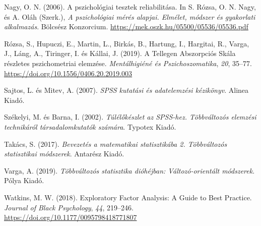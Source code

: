 \documentclass[
  letterpaper,
]{krantz}
\newlength{\cslhangindent}
\newlength{\cslentryspacingunit} %
\newenvironment{CSLReferences}[2] %
 {%
  \setlength{\parindent}{0pt}
  \ifodd #1
  \let\oldpar\par
  \def\par{\hangindent=\cslhangindent\oldpar}
  \fi
  \setlength{\parskip}{#2\cslentryspacingunit}
 }%
 {}
\begin{document}
\begin{CSLReferences}{1}{0}
\leavevmode{}%
Nagy, O. N. (2006). A pszichológiai tesztek reliabilitása. In S. Rózsa,
O. N. Nagy, és A. Oláh (Szerk.), \emph{A pszichológiai mérés alapjai.
Elmélet, módszer és gyakorlati alkalmazás}. Bölcsész Konzorcium.
\url{https://mek.oszk.hu/05500/05536/05536.pdf}

\leavevmode{}%
Rózsa, S., Hupuczi, E., Martin, L., Birkás, B., Hartung, I., Hargitai,
R., Varga, J., Láng, A., Tiringer, I. és Kállai, J. (2019). A Tellegen
Abszorpciós Skála részletes pszichometriai elemzése. \emph{Mentálhigiéné
és Pszichoszomatika}, \emph{20}, 35--77.
\url{https://doi.org/10.1556/0406.20.2019.003}

\leavevmode{}%
Sajtos, L. és Mitev, A. (2007). \emph{SPSS kutatási és adatelemzési
kézikönyv}. Alinea Kiadó.

\leavevmode{}%
Székelyi, M. és Barna, I. (2002). \emph{Túlélőkészlet az SPSS-hez.
Többváltozós elemzési technikáról társadalomkutatók számára}. Typotex
Kiadó.

\leavevmode{}%
Takács, S. (2017). \emph{Bevezetés a matematikai statisztikába 2.
Többváltozós statisztikai módszerek}. Antarész Kiadó.

\leavevmode{}%
Varga, A. (2019). \emph{Többváltozós statisztika dióhéjban:
Változó-orientált módszerek}. Pólya Kiadó.

\leavevmode{}%
Watkins, M. W. (2018). Exploratory Factor Analysis: A Guide to Best
Practice. \emph{Journal of Black Psychology}, \emph{44}, 219--246.
\url{https://doi.org/10.1177/0095798418771807}

\end{CSLReferences}



\backmatter
\printindex
\end{document}
